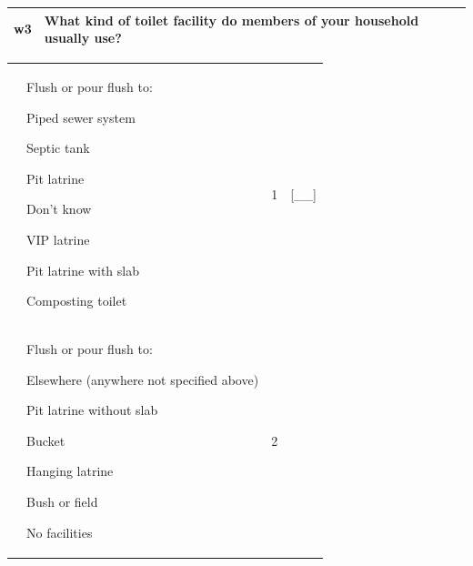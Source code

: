\documentclass[12pt,a4paper]{book}
\theoremstyle{definition}
\theoremstyle{definition}
\theoremstyle{definition}
\theoremstyle{remark}
\begin{document}
\begin{longtable}[]{@{}llll@{}}
\toprule
\begin{minipage}[t]{0.09\columnwidth}\raggedright
w3\strut
\end{minipage} & \begin{minipage}[t]{0.41\columnwidth}\raggedright
What kind of toilet facility do members of your household usually
use?\strut
\end{minipage} & \begin{minipage}[t]{0.25\columnwidth}\raggedright
\strut
\end{minipage} & \begin{minipage}[t]{0.13\columnwidth}\raggedright
\strut
\end{minipage}\tabularnewline
\bottomrule
\end{longtable}

\begin{longtable}[]{@{}llll@{}}
\toprule
\begin{minipage}[t]{0.24\columnwidth}\raggedright
\strut
\end{minipage} & \begin{minipage}[t]{0.24\columnwidth}\raggedright
Flush or pour flush to:

Piped sewer system

Septic tank

Pit latrine

Don't know

VIP latrine

Pit latrine with slab

Composting toilet\strut
\end{minipage} & \begin{minipage}[t]{0.24\columnwidth}\raggedright
1\strut
\end{minipage} & \begin{minipage}[t]{0.24\columnwidth}\raggedright
{[}\_\_{]}\strut
\end{minipage}\tabularnewline
\begin{minipage}[t]{0.24\columnwidth}\raggedright
\strut
\end{minipage} & \begin{minipage}[t]{0.24\columnwidth}\raggedright
Flush or pour flush to:

Elsewhere (anywhere not specified above)

Pit latrine without slab

Bucket

Hanging latrine

Bush or field

No facilities\strut
\end{minipage} & \begin{minipage}[t]{0.24\columnwidth}\raggedright
2\strut
\end{minipage} & \begin{minipage}[t]{0.24\columnwidth}\raggedright
\strut
\end{minipage}\tabularnewline
\bottomrule
\end{longtable}
\end{document}
